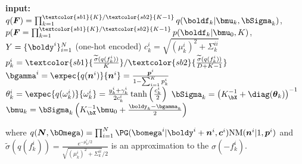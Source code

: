 \begin{algorithm}[H]
    \caption{\ac{CAVI} updates: $\textcolor{sb1}{K}/\textcolor{sb2}{K - 1}$ latent \acp{GP} for $K$ classes}
    \begin{algorithmic}
    \State \textbf{input:} $q(\boldsymbol{F}) = \prod_{k=1}^{\textcolor{sb1}{K}/\textcolor{sb2}{K - 1}} q(\boldf_k|\bmu_k, \bSigma_k)$, $p(\boldsymbol{F} = \prod_{k=1}^{\textcolor{sb1}{K}/\textcolor{sb2}{K - 1}} p(\boldf_k|\bmu_0, K)$, $Y=\{\boldy^i\}_{i=1}^N$ (one-hot encoded)
        \State $c^i_k = \sqrt{(\mu^i_k)^2 + \Sigma_k^{ii}}$
        \State $p^i_k = \textcolor{sb1}{\frac{\widetilde{\sigma}(q(f_k^i))}{K}}/\textcolor{sb2}{\frac{\widetilde{\sigma}(q(f_k^i))}{D + K - 1}}$
        \State $\bgamma^i = \expec{q(\boldsymbol{n}^i)}{\boldsymbol{n}^i} = \frac{\boldsymbol{p}^i}{1 - \sum_{i=1}^K p^i_k}$
        \State $\theta_k^i = \expec{q(\omega_k^i)}{\omega_k^i} = \frac{y_k^i + \gamma_k^i}{2c_k^i}\tanh\left(\frac{c_k^i}{2}\right)$
        \State $\bSigma_k = \left(K_{\bX}^{-1} + \diag(\boldsymbol{\theta}_k)\right)^{-1}$
        \State $\bmu_k = \bSigma_k\left(K_{\bX}^{-1}\bmu_0 + \frac{\boldy_k - \bgamma_k}{2}\right)$
    \EndWhile
    \end{algorithmic}
    where $q(\boldsymbol{N}, \bOmega) = \prod_{i=1}^N \PG(\bomega^i|\boldy^i + \boldsymbol{n}^i, \boldsymbol{c}^i)\mathrm{NM}(\boldsymbol{n}^i|1, \boldsymbol{p}^i)$ and $\widetilde{\sigma}(q(f_k^i)) = \frac{e^{-\mu_k^i/2}}{\sqrt{(\mu_k^i)^2 + \Sigma^{ii}_k} / 2}$ is an approximation to the $\sigma(-f^i_k)$.
    \label{alg:cavi_multiclass}
\end{algorithm}

